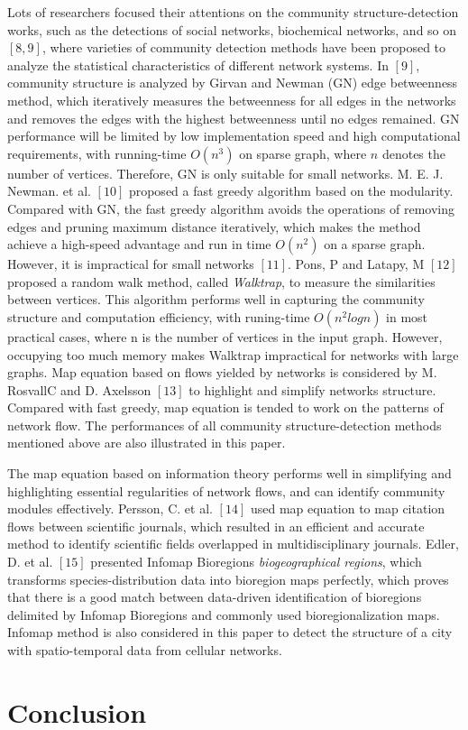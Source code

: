 Lots of researchers focused their attentions on the community structure-detection works, such as the detections of social networks, biochemical networks, and so on $[8,9]$, where varieties of community detection methods have been proposed to analyze the statistical characteristics of different network systems. In $[9]$, community structure is analyzed by Girvan and Newman (GN) edge betweenness method, which iteratively measures the betweenness for all edges in the networks and removes the edges with the highest betweenness until no edges remained. GN performance will be limited by low implementation speed and high computational requirements, with running-time $O(n^3)$ on sparse graph, where $n$ denotes the number of vertices. Therefore, GN is only suitable for small networks. M. E. J. Newman. et al. $[10]$ proposed a fast greedy algorithm based on the modularity. Compared with GN, the fast greedy algorithm avoids the operations of removing edges and pruning maximum distance iteratively, which makes the method achieve a high-speed advantage and run in time $O(n^2)$ on a sparse graph. However, it is impractical for small networks $[11]$. Pons, P and Latapy, M $[12]$ proposed a random walk method, called \emph{Walktrap}, to measure the similarities between vertices. This algorithm performs well in capturing the community structure and computation efficiency, with runing-time $O(n^2logn)$ in most practical cases, where n is the number of vertices in the input graph. However, occupying too much memory makes Walktrap impractical for networks with large graphs. Map equation based on flows yielded by networks is considered by M. RosvallC and D. Axelsson $[13]$ to highlight and simplify networks structure. Compared with fast greedy, map equation is tended to work on the patterns of network flow. The performances of all community structure-detection methods mentioned above are also illustrated in this paper.

The map equation based on information theory performs well in simplifying and highlighting essential regularities of network flows, and can identify community modules effectively. Persson, C. et al. $[14]$ used map equation to map citation flows between scientific journals, which resulted in an efficient and accurate method to identify scientific fields overlapped in multidisciplinary journals. Edler, D. et al. $[15]$ presented Infomap Bioregions \emph{biogeographical regions}, which transforms species-distribution data into bioregion maps perfectly, which proves that there is a good match between data-driven identification of bioregions delimited by Infomap Bioregions and commonly used bioregionalization maps. Infomap method is also considered in this paper to detect the structure of a city with spatio-temporal data from cellular networks.



\section{Conclusion}